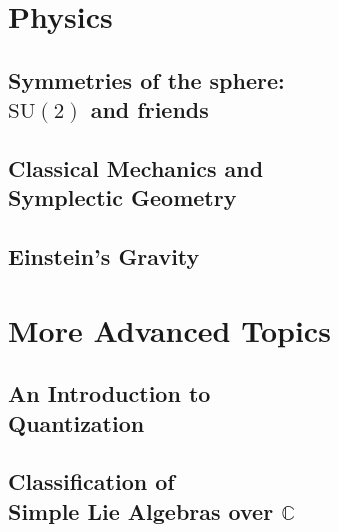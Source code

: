 \documentclass[12pt, twoside, openany]{book}
\newcommand{\1}{\mathbbm{1}}
\begin{document}
\part{Physics}

\chapter[Symmetries of the sphere: $\mathrm{SU}(2)$ and friends]{Symmetries of the sphere: \\$\mathrm{SU}(2)$ and friends}

\chapter[Classical Mechanics and Symplectic Geometry]{Classical Mechanics and\\ Symplectic Geometry}

\chapter{Einstein's Gravity}

\part{More Advanced Topics}

\chapter[An Introduction to Quantization]{An Introduction to \\Quantization}

\chapter[Classification of Simple Lie Algebras over $\mathbb C$]{Classification of\\ Simple Lie Algebras over $\mathbb{C}$}



\printindex
\end{document}
